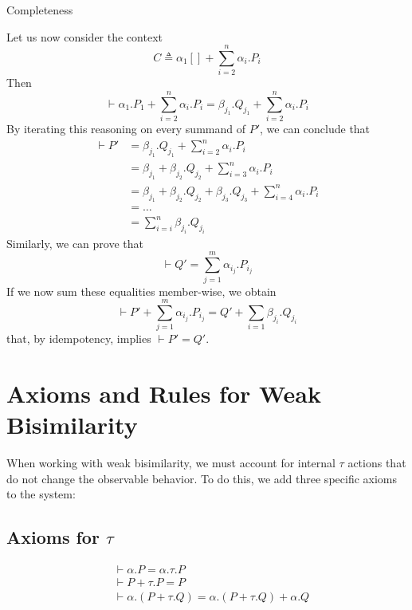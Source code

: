 \begin{Thm}{Completeness}{}
\begin{demonstration}
        Let us now consider the context
        \begin{equation*}
            C\triangleq \alpha_1[]+\sum_{i = 2}^n\alpha_i.P_i
        \end{equation*}
        Then
        \begin{equation*}
            \vdash \alpha_1.P_1 + \sum_{i = 2}^n\alpha_i.P_i = \beta_{j_1}.Q_{j_1} + \sum_{i = 2}^n\alpha_i.P_i
        \end{equation*}
        By iterating this reasoning on every summand of $P'$, we can conclude that
        \begin{align*}
            \vdash P' &= \beta_{j_1}.Q_{j_1} + \sum_{i = 2}^n\alpha_i.P_i\\
            &= \beta_{j_1} + \beta_{j_2}.Q_{j_2} + \sum_{i = 3}^n\alpha_i.P_i\\
            &= \beta_{j_1} + \beta_{j_2}.Q_{j_2} + \beta_{j_3}.Q_{j_3} + \sum_{i = 4}^n\alpha_i.P_i\\
            &= \ldots\\
            &= \sum_{i = i}^n\beta_{j_i}.Q_{j_i}
        \end{align*}
        Similarly, we can prove that
        \begin{equation*}
            \vdash Q' = \sum_{j = 1}^m\alpha_{i_j}.P_{i_j}
        \end{equation*}
        If we now sum these equalities member-wise, we obtain
        \begin{equation*}
            \vdash P' + \sum_{j = 1}^m\alpha_{i_j}.P_{i_j} = Q'+\sum_{i = 1}\beta_{j_i}.Q_{j_i}
        \end{equation*}
        that, by idempotency, implies $\vdash P' = Q'$.
    \end{demonstration}
\end{Thm}

\section{Axioms and Rules for Weak Bisimilarity}
When working with weak bisimilarity, we must account for internal $\tau$ actions that do not change the observable behavior. To do this, we add three specific axioms to the system:

\subsection{Axioms for $\tau$}
\begin{align*}
    &\vdash \alpha.P = \alpha.\tau.P\\
    &\vdash P + \tau.P = P\\
    &\vdash \alpha.(P + \tau.Q) = \alpha.(P + \tau.Q) + \alpha.Q
\end{align*}

